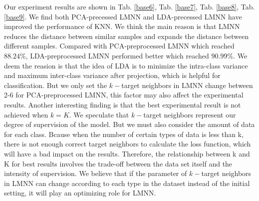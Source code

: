 \documentclass[conference]{IEEEtran}
\begin{document}
Our experiment results are shown in Tab. \ref{base6}, Tab. \ref{base7}, Tab. \ref{base8}, Tab. \ref{base9}. We find both PCA-precessed LMNN and LDA-precessed LMNN have improved the performance of KNN. We think the main reason is that LMNN reduces the distance between similar samples and expands the distance between different samples. Compared with PCA-preprocessed LMNN which reached $88.24\%$, LDA-preprocessed LMNN performed better which reached $90.99\%$. We deem the reasion is that the idea of LDA is to minimize the intra-class variance and maximum inter-class variance after projection, which is helpful for classification. But we only set the $k-$target neighbors in LMNN change between 2-6 for PCA-preprocessed LMNN, this factor may also affect the experimental results. Another interesting finding is that the best experimental result is not achieved when $k = K$. We speculate that $k-$target neighbors represent our degree of supervision of the model. But we must also consider the amount of data for each class. Bcause when the number of certain types of data is less than k, there is not enough correct target neighbors to calculate the loss function, which will have a bad impact on the results. Therefore, the relationship between k and K for best results involves the trade-off between the data set itself and the intensity of supervision. We believe that if the parameter of $k-$target neighbors in LMNN can change according to each type in the dataset instead of the initial setting, it will play an optimizing role for LMNN.
\end{document}
